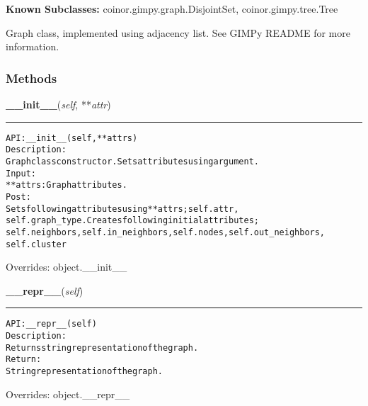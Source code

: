 \textbf{Known Subclasses:}
coinor.gimpy.graph.DisjointSet,
    coinor.gimpy.tree.Tree

Graph class, implemented using adjacency list. See GIMPy README for more 
information.



  \subsubsection{Methods}

    \vspace{0.5ex}

\hspace{.8\funcindent}\begin{boxedminipage}{\funcwidth}

    \raggedright \textbf{\_\_init\_\_}(\textit{self}, **\textit{attr})

    \vspace{-1.5ex}

    \rule{\textwidth}{0.5\fboxrule}
\setlength{\parskip}{2ex}
\begin{alltt}

API: \_\_init\_\_(self, **attrs)
Description:
Graph class constructor. Sets attributes using argument.
Input:
    **attrs: Graph attributes.
Post:
    Sets following attributes using **attrs; self.attr,
    self.graph\_type. Creates following initial attributes;
    self.neighbors, self.in\_neighbors, self.nodes, self.out\_neighbors,
    self.cluster
\end{alltt}

\setlength{\parskip}{1ex}
      Overrides: object.\_\_init\_\_

    \end{boxedminipage}

    \vspace{0.5ex}

\hspace{.8\funcindent}\begin{boxedminipage}{\funcwidth}

    \raggedright \textbf{\_\_repr\_\_}(\textit{self})

    \vspace{-1.5ex}

    \rule{\textwidth}{0.5\fboxrule}
\setlength{\parskip}{2ex}
\begin{alltt}

API: \_\_repr\_\_(self)
Description:
Returns string representation of the graph.
Return:
    String representation of the graph.
\end{alltt}

\setlength{\parskip}{1ex}
      Overrides: object.\_\_repr\_\_

    \end{boxedminipage}

